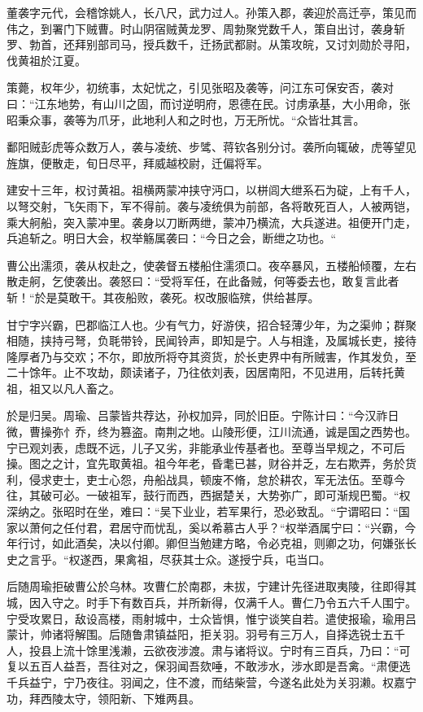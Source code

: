 \documentclass[12pt,UTF8]{ctexbook}
\begin{document}
董袭字元代，会稽馀姚人，长八尺，武力过人。孙策入郡，袭迎於高迁亭，策见而伟之，到署门下贼曹。时山阴宿贼黄龙罗、周勃聚党数千人，策自出讨，袭身斩罗、勃首，还拜别部司马，授兵数千，迁扬武都尉。从策攻皖，又讨刘勋於寻阳，伐黄祖於江夏。

策薨，权年少，初统事，太妃忧之，引见张昭及袭等，问江东可保安否，袭对曰：“江东地势，有山川之固，而讨逆明府，恩德在民。讨虏承基，大小用命，张昭秉众事，袭等为爪牙，此地利人和之时也，万无所忧。“众皆壮其言。

鄱阳贼彭虎等众数万人，袭与凌统、步骘、蒋钦各别分讨。袭所向辄破，虎等望见旌旗，便散走，旬日尽平，拜威越校尉，迁偏将军。

建安十三年，权讨黄祖。祖横两蒙冲挟守沔口，以栟闾大绁系石为碇，上有千人，以弩交射，飞矢雨下，军不得前。袭与凌统俱为前部，各将敢死百人，人被两铠，乘大舸船，突入蒙冲里。袭身以刀断两绁，蒙冲乃横流，大兵遂进。祖便开门走，兵追斩之。明日大会，权举觞属袭曰：“今日之会，断绁之功也。“

曹公出濡须，袭从权赴之，使袭督五楼船住濡须口。夜卒暴风，五楼船倾覆，左右散走舸，乞使袭出。袭怒曰：“受将军任，在此备贼，何等委去也，敢复言此者斩！“於是莫敢干。其夜船败，袭死。权改服临殡，供给甚厚。

甘宁字兴霸，巴郡临江人也。少有气力，好游侠，招合轻薄少年，为之渠帅；群聚相随，挟持弓弩，负毦带铃，民闻铃声，即知是宁。人与相逢，及属城长吏，接待隆厚者乃与交欢；不尔，即放所将夺其资货，於长吏界中有所贼害，作其发负，至二十馀年。止不攻劫，颇读诸子，乃往依刘表，因居南阳，不见进用，后转托黄祖，祖又以凡人畜之。

於是归吴。周瑜、吕蒙皆共荐达，孙权加异，同於旧臣。宁陈计曰：“今汉祚日微，曹操弥忄乔，终为篡盗。南荆之地。山陵形便，江川流通，诚是国之西势也。宁已观刘表，虑既不远，儿子又劣，非能承业传基者也。至尊当早规之，不可后操。图之之计，宜先取黄祖。祖今年老，昏耄已甚，财谷并乏，左右欺弄，务於货利，侵求吏士，吏士心怨，舟船战具，顿废不脩，怠於耕农，军无法伍。至尊今往，其破可必。一破祖军，鼓行而西，西据楚关，大势弥广，即可渐规巴蜀。“权深纳之。张昭时在坐，难曰：“吴下业业，若军果行，恐必致乱。“宁谓昭曰：“国家以萧何之任付君，君居守而忧乱，奚以希慕古人乎？“权举酒属宁曰：“兴霸，今年行讨，如此酒矣，决以付卿。卿但当勉建方略，令必克祖，则卿之功，何嫌张长史之言乎。“权遂西，果禽祖，尽获其士众。遂授宁兵，屯当口。

后随周瑜拒破曹公於乌林。攻曹仁於南郡，未拔，宁建计先径进取夷陵，往即得其城，因入守之。时手下有数百兵，并所新得，仅满千人。曹仁乃令五六千人围宁。宁受攻累日，敌设高楼，雨射城中，士众皆惧，惟宁谈笑自若。遣使报瑜，瑜用吕蒙计，帅诸将解围。后随鲁肃镇益阳，拒关羽。羽号有三万人，自择选锐士五千人，投县上流十馀里浅濑，云欲夜涉渡。肃与诸将议。宁时有三百兵，乃曰：“可复以五百人益吾，吾往对之，保羽闻吾欬唾，不敢涉水，涉水即是吾禽。“肃便选千兵益宁，宁乃夜往。羽闻之，住不渡，而结柴营，今遂名此处为关羽濑。权嘉宁功，拜西陵太守，领阳新、下雉两县。
\end{document}
